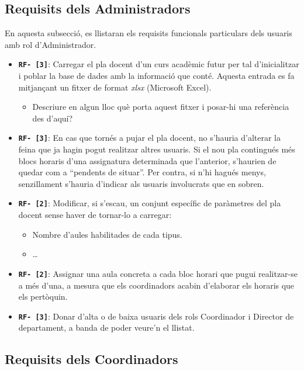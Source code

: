 \documentclass[a4paper,12pt]{ThesisStyle}
\begin{document}
\subsection{Requisits dels Administradors}
\label{subsec:requisits_administradors}

En aquesta subsecció, es llistaran els requisits funcionals particulars dels usuaris amb rol d'Administrador.

\begin{itemize}
  \item \texttt{\textbf{RF- [3]}}: Carregar el pla docent d'un curs acadèmic futur per tal d'inicialitzar i poblar la base de dades amb la informació que conté. Aquesta entrada es fa mitjançant un fitxer de format \emph{xlsx} (Microsoft Excel).
    \begin{itemize}
      \item Descriure en algun lloc què porta aquest fitxer i posar-hi una referència des d'aquí?
    \end{itemize}
  \item \texttt{\textbf{RF- [3]}}: En cas que tornés a pujar el pla docent, no s'hauria d'alterar la feina que ja hagin pogut realitzar altres usuaris. Si el nou pla contingués més blocs horaris d'una assignatura determinada que l'anterior, s'haurien de quedar com a ``pendents de situar''. Per contra, si n'hi hagués menys, senzillament s'hauria d'indicar als usuaris involucrats que en sobren.
  \item \texttt{\textbf{RF- [2]}}: Modificar, si s'escau, un conjunt específic de paràmetres del pla docent sense haver de tornar-lo a carregar:
    \begin{itemize}
      \item Nombre d'aules habilitades de cada tipus.
      \item \ldots
    \end{itemize}
  \item \texttt{\textbf{RF- [2]}}: Assignar una aula concreta a cada bloc horari que pugui realitzar-se a més d'una, a mesura que els coordinadors acabin d'elaborar els horaris que els pertòquin.
  \item \texttt{\textbf{RF- [3]}}: Donar d'alta o de baixa usuaris dels rols Coordinador i Director de departament, a banda de poder veure'n el llistat.
\end{itemize}

\subsection{Requisits dels Coordinadors}
\label{subsec:requisits_coordinadors}
\end{document}
